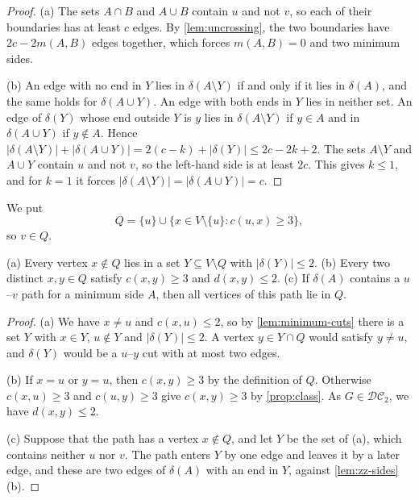 \documentclass[pdflatex,sn-mathphys-num]{sn-jnl}%
\theoremstyle{thmstyleone}%
\theoremstyle{thmstyletwo}%
\theoremstyle{thmstylethree}%
\newcommand{\DC}{\mathcal{DC}_2}%
\begin{document}
\begin{proof}
(a) The sets $A \cap B$ and $A \cup B$ contain $u$ and not $v$, so each of their boundaries has at least $c$ edges.
By \cref{lem:uncrossing}, the two boundaries have $2c - 2m(A, B)$ edges together, which forces $m(A, B) = 0$ and two minimum sides.

(b) An edge with no end in $Y$ lies in $\delta(A \setminus Y)$ if and only if it lies in $\delta(A)$, and the same holds for $\delta(A \cup Y)$.
An edge with both ends in $Y$ lies in neither set.
An edge of $\delta(Y)$ whose end outside $Y$ is $y$ lies in $\delta(A \setminus Y)$ if $y \in A$ and in $\delta(A \cup Y)$ if $y \notin A$.
Hence $|\delta(A \setminus Y)| + |\delta(A \cup Y)| = 2(c - k) + |\delta(Y)| \leq 2c - 2k + 2$.
The sets $A \setminus Y$ and $A \cup Y$ contain $u$ and not $v$, so the left-hand side is at least $2c$.
This gives $k \leq 1$, and for $k = 1$ it forces $|\delta(A \setminus Y)| = |\delta(A \cup Y)| = c$.
\end{proof}

We put
\[
Q = \{u\} \cup \{x \in V \setminus \{u\} : c(u, x) \geq 3\},
\]
so $v \in Q$.

\begin{lemma}
\label{lem:zz-q}
(a) Every vertex $x \notin Q$ lies in a set $Y \subseteq V \setminus Q$ with $|\delta(Y)| \leq 2$.
(b) Every two distinct $x, y \in Q$ satisfy $c(x, y) \geq 3$ and $d(x, y) \leq 2$.
(c) If $\delta(A)$ contains a $u$--$v$ path for a minimum side $A$, then all vertices of this path lie in $Q$.
\end{lemma}

\begin{proof}
(a) We have $x \neq u$ and $c(x, u) \leq 2$, so by \cref{lem:minimum-cuts} there is a set $Y$ with $x \in Y$, $u \notin Y$ and $|\delta(Y)| \leq 2$.
A vertex $y \in Y \cap Q$ would satisfy $y \neq u$, and $\delta(Y)$ would be a $u$--$y$ cut with at most two edges.

(b) If $x = u$ or $y = u$, then $c(x, y) \geq 3$ by the definition of $Q$.
Otherwise $c(x, u) \geq 3$ and $c(u, y) \geq 3$ give $c(x, y) \geq 3$ by \cref{prop:class}.
As $G \in \DC$, we have $d(x, y) \leq 2$.

(c) Suppose that the path has a vertex $x \notin Q$, and let $Y$ be the set of (a), which contains neither $u$ nor $v$.
The path enters $Y$ by one edge and leaves it by a later edge, and these are two edges of $\delta(A)$ with an end in $Y$, against \cref{lem:zz-sides}(b).
\end{proof}
\end{document}
